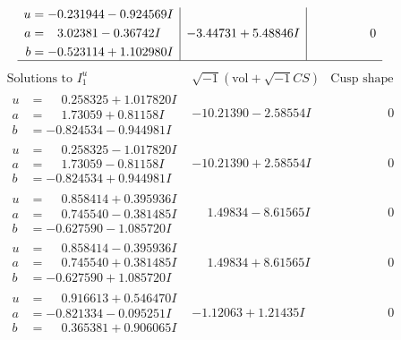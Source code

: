 \documentclass[1p]{elsarticle_modified}
\theoremstyle{definition}
\newcommand{\I}{\sqrt{-1}}
\begin{document}
$$\begin{array}{c|c|c}
\begin{aligned}
u &= -0.231944 - 0.924569 I \\
a &= \phantom{-}3.02381 - 0.36742 I \\
b &= -0.523114 + 1.102980 I\end{aligned}
 & -3.44731 + 5.48846 I & \phantom{-0.000000 } 0\\
 \hline 
 \end{array}$$\newpage$$\begin{array}{c|c|c}  
\text{Solutions to }I^u_{1}& \I (\text{vol} + \sqrt{-1}CS) & \text{Cusp shape}\\
 \hline 
\begin{aligned}
u &= \phantom{-}0.258325 + 1.017820 I \\
a &= \phantom{-}1.73059 + 0.81158 I \\
b &= -0.824534 - 0.944981 I\end{aligned}
 & -10.21390 - 2.58554 I & \phantom{-0.000000 } 0 \\ \hline\begin{aligned}
u &= \phantom{-}0.258325 - 1.017820 I \\
a &= \phantom{-}1.73059 - 0.81158 I \\
b &= -0.824534 + 0.944981 I\end{aligned}
 & -10.21390 + 2.58554 I & \phantom{-0.000000 } 0 \\ \hline\begin{aligned}
u &= \phantom{-}0.858414 + 0.395936 I \\
a &= \phantom{-}0.745540 - 0.381485 I \\
b &= -0.627590 - 1.085720 I\end{aligned}
 & \phantom{-}1.49834 - 8.61565 I & \phantom{-0.000000 } 0 \\ \hline\begin{aligned}
u &= \phantom{-}0.858414 - 0.395936 I \\
a &= \phantom{-}0.745540 + 0.381485 I \\
b &= -0.627590 + 1.085720 I\end{aligned}
 & \phantom{-}1.49834 + 8.61565 I & \phantom{-0.000000 } 0 \\ \hline\begin{aligned}
u &= \phantom{-}0.916613 + 0.546470 I \\
a &= -0.821334 - 0.095251 I \\
b &= \phantom{-}0.365381 + 0.906065 I\end{aligned}
 & -1.12063 + 1.21435 I & \phantom{-0.000000 } 0 \\ \hline\begin{aligned}

\end{aligned}
\end{array}$$
\end{document}
